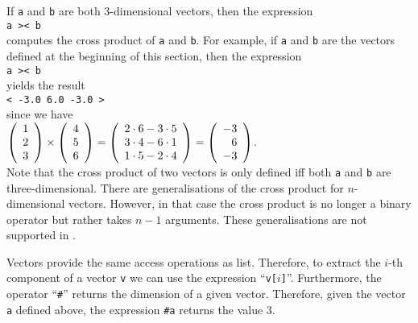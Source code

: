 If \texttt{a} and
\texttt{b} are both 3-dimensional vectors, then the expression
\\[0.2cm]
\hspace*{1.3cm}
\texttt{a >< b}
\\[0.2cm]
computes the cross product of \texttt{a} and \texttt{b}.  For example, if \texttt{a} and \texttt{b}
are the vectors defined at the beginning of this section, then the expression
\\[0.2cm]
\hspace*{1.3cm}
\texttt{a >< b}
\\[0.2cm]
yields the result
\\[0.2cm]
\hspace*{1.3cm}
\texttt{< -3.0  6.0  -3.0 >}
\\[0.2cm]
since we have
\\[0.2cm]
\hspace*{1.3cm}
$\left(
 \begin{array}[c]{l}
   1 \\ 2 \\ 3
 \end{array}
 \right)
   \times
 \left(
 \begin{array}[c]{l}
    4 \\ 5 \\ 6
 \end{array}
 \right)
    =
 \left(
  \begin{array}[c]{l}
    2 \cdot 6 - 3 \cdot 5 \\ 3 \cdot 4 - 6 \cdot 1 \\ 1 \cdot 5 - 2 \cdot 4
  \end{array}
 \right)
    =
 \left(
  \begin{array}[c]{r}
    -3 \\ 6 \\ -3
  \end{array}
 \right)
$.
\\[0.2cm]
Note that the cross product of two vectors is only defined iff both \texttt{a} and \texttt{b} are 
three-dimensional.  There are generalisations of the cross product for $n$-dimensional vectors.
However, in that case the cross product is no longer a binary operator but rather takes $n-1$ arguments.
These generalisations are not supported in \setlx.

Vectors provide the same access operations as list.  Therefore, to extract the $i$-th component of a
vector \texttt{v} we can use the expression ``\texttt{v[$i$]}''.  Furthermore, the operator
``\texttt{\#}'' returns the dimension of a given vector.  Therefore, given the vector \texttt{a}
defined above, the expression \texttt{\#a} returns the value 3.


